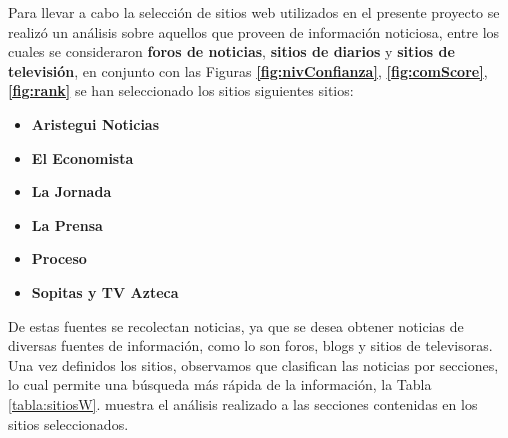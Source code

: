 Para llevar a cabo la selección de sitios web utilizados en el presente proyecto se realizó un análisis sobre aquellos que proveen de información noticiosa, entre los cuales se consideraron \textbf{foros de noticias}, \textbf{sitios de diarios} y \textbf{sitios de televisión}, en conjunto con las Figuras \textbf{\ref{fig:nivConfianza}}, \textbf{\ref{fig:comScore}}, \textbf{\ref{fig:rank}} se han seleccionado los sitios siguientes sitios:

\begin{itemize}

  \item \textbf{Aristegui Noticias}
  \item \textbf{El Economista}
  \item \textbf{La Jornada}
  \item \textbf{La Prensa}
  \item \textbf{Proceso}
  \item \textbf{Sopitas y TV Azteca}

\end{itemize}

De estas fuentes se recolectan noticias, ya que se desea obtener noticias de diversas fuentes de información, como lo son foros, blogs y sitios de televisoras.\\ 

Una vez definidos los sitios,  observamos que clasifican las noticias por secciones, lo cual permite una búsqueda más rápida de la información, la Tabla \ref{tabla:sitiosW}. muestra el análisis realizado a las secciones contenidas en los sitios seleccionados.
\\

